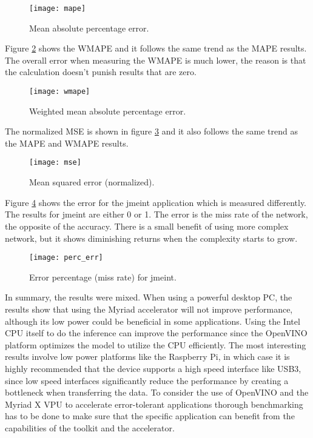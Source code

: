 \begin{figure}[thbp]
	\centering
	\texttt{[image: mape]}
	\caption{Mean absolute percentage error.}
	\label{fig:mape}
\end{figure}

Figure \ref{fig:wmape} shows the WMAPE and it follows the same trend as the MAPE results. The overall error when measuring the WMAPE is much lower, the reason is that the calculation doesn't punish results that are zero.

\begin{figure}[thbp]
	\centering
	\texttt{[image: wmape]}
	\caption{Weighted mean absolute percentage error.}
	\label{fig:wmape}
\end{figure}

The normalized MSE is shown in figure \ref{fig:mse} and it also follows the same trend as the MAPE and WMAPE results.

\begin{figure}[thbp]
	\centering
	\texttt{[image: mse]}
	\caption{Mean squared error (normalized).}
	\label{fig:mse}
\end{figure}

Figure \ref{fig:perc_err} shows the error for the jmeint application which is measured differently. The results for jmeint are either 0 or 1. The error is the miss rate of the network, the opposite of the accuracy. There is a small benefit of using more complex network, but it shows diminishing returns when the complexity starts to grow.

\begin{figure}[thbp]
	\centering
	\texttt{[image: perc\_err]}
	\caption{Error percentage (miss rate) for jmeint.}
	\label{fig:perc_err}
\end{figure}

In summary, the results were mixed. When using a powerful desktop PC, the results show that using the Myriad accelerator will not improve performance, although its low power could be beneficial in some applications. Using the Intel CPU itself to do the inference can improve the performance since the OpenVINO platform optimizes the model to utilize the CPU efficiently. The most interesting results involve low power platforms like the Raspberry Pi, in which case it is highly recommended that the device supports a high speed interface like USB3, since low speed interfaces significantly reduce the performance by creating a bottleneck when transferring the data. To consider the use of OpenVINO and the Myriad X VPU to accelerate error-tolerant applications thorough benchmarking has to be done to make sure that the specific application can benefit from the capabilities of the toolkit and the accelerator.
